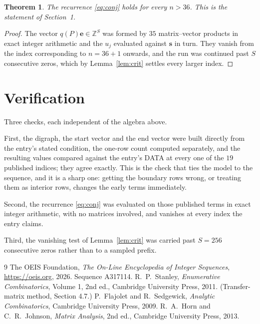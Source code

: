 \documentclass[11pt,a4paper]{article}
\theoremstyle{plain}
\newtheorem{theorem}{Theorem}
\theoremstyle{definition}
\begin{document}
\begin{theorem}
The recurrence \eqref{eq:conj} holds for every $n>36$. This is the statement of
Section~1.
\end{theorem}

\begin{proof}
The vector $q(P)\mathbf{e}\in\mathbb{Z}^{S}$ was formed by $35$ matrix--vector
products in exact integer arithmetic and the $u_j$ evaluated against $\mathbf{s}$ in turn.
They vanish from the index corresponding to $n=36+1$ onwards, and the run was continued
past $S$ consecutive zeros, which by Lemma~\ref{lem:crit} settles every larger index.
\end{proof}

\section{Verification}

Three checks, each independent of the algebra above.

First, the digraph, the start vector and the end vector were built directly from the
entry's stated condition, the one-row count computed separately, and the resulting values
compared against the entry's DATA at every one of the $19$ published indices; they
agree exactly. This is the check that ties the model to the sequence, and it is a sharp one:
getting the boundary rows wrong, or treating them as interior rows, changes the early terms
immediately.

Second, the recurrence \eqref{eq:conj} was evaluated on those published terms in exact
integer arithmetic, with no matrices involved, and vanishes at every index the entry claims.

Third, the vanishing test of Lemma~\ref{lem:crit} was carried past $S=256$ consecutive
zeros rather than to a sampled prefix.

\begin{thebibliography}{9}
 The OEIS Foundation, \emph{The On-Line Encyclopedia of Integer
Sequences}, \url{https://oeis.org}, 2026. Sequence A317114.
 R.~P.~Stanley, \emph{Enumerative Combinatorics}, Volume 1, 2nd ed.,
Cambridge University Press, 2011. (Transfer-matrix method, Section 4.7.)
 P.~Flajolet and R.~Sedgewick, \emph{Analytic Combinatorics}, Cambridge
University Press, 2009.
 R.~A.~Horn and C.~R.~Johnson, \emph{Matrix Analysis}, 2nd ed., Cambridge
University Press, 2013.
\end{thebibliography}
\end{document}
